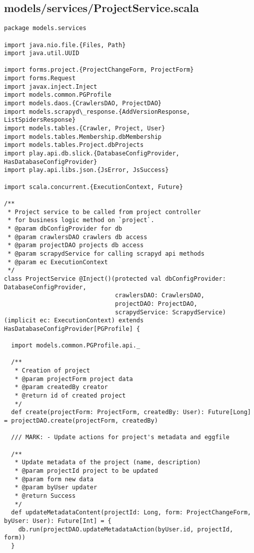 \subsection{models/services/ProjectService.scala}
\begin{lstlisting}
package models.services

import java.nio.file.{Files, Path}
import java.util.UUID

import forms.project.{ProjectChangeForm, ProjectForm}
import forms.Request
import javax.inject.Inject
import models.common.PGProfile
import models.daos.{CrawlersDAO, ProjectDAO}
import models.scrapyd\_response.{AddVersionResponse, ListSpidersResponse}
import models.tables.{Crawler, Project, User}
import models.tables.Membership.dbMembership
import models.tables.Project.dbProjects
import play.api.db.slick.{DatabaseConfigProvider, HasDatabaseConfigProvider}
import play.api.libs.json.{JsError, JsSuccess}

import scala.concurrent.{ExecutionContext, Future}

/**
 * Project service to be called from project controller
 * for business logic method on `project`.
 * @param dbConfigProvider for db
 * @param crawlersDAO crawlers db access
 * @param projectDAO projects db access
 * @param scrapydService for calling scrapyd api methods
 * @param ec ExecutionContext
 */
class ProjectService @Inject()(protected val dbConfigProvider: DatabaseConfigProvider,
                               crawlersDAO: CrawlersDAO,
                               projectDAO: ProjectDAO,
                               scrapydService: ScrapydService)(implicit ec: ExecutionContext) extends HasDatabaseConfigProvider[PGProfile] {

  import models.common.PGProfile.api._

  /**
   * Creation of project
   * @param projectForm project data
   * @param createdBy creator
   * @return id of created project
   */
  def create(projectForm: ProjectForm, createdBy: User): Future[Long] = projectDAO.create(projectForm, createdBy)

  /// MARK: - Update actions for project's metadata and eggfile

  /**
   * Update metadata of the project (name, description)
   * @param projectId project to be updated
   * @param form new data
   * @param byUser updater
   * @return Success
   */
  def updateMetadataContent(projectId: Long, form: ProjectChangeForm, byUser: User): Future[Int] = {
    db.run(projectDAO.updateMetadataAction(byUser.id, projectId, form))
  }


\end{lstlisting}
